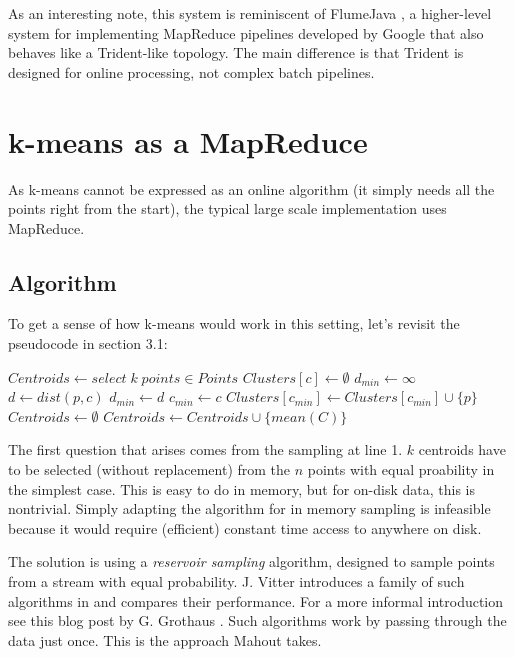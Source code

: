 \documentclass{article}
\begin{document}
As an interesting note, this system is reminiscent of FlumeJava \cite{flume}, 
a higher-level system for implementing MapReduce pipelines developed by Google
that also behaves like a Trident-like topology. The main difference is that
Trident is designed for online processing, not complex batch pipelines.

\section{k-means as a MapReduce}

As k-means cannot be expressed as an online algorithm (it simply needs all the
points right from the start), the typical large scale implementation uses
MapReduce.

\subsection{Algorithm}

To get a sense of how k-means would work in this setting, let's revisit the
pseudocode in section 3.1:

\begin{algorithmic}[1]
    \State $Centroids\gets select\; k\; points \in Points$
            \State $Clusters[c]\gets \emptyset$
        \EndFor
            \State $d_{min}\gets \infty$
                \State $d\gets dist(p, c)$
                    \State $d_{min}\gets d$
                    \State $c_{min} \gets c$
                \EndIf
            \EndFor
            \State $Clusters[c_{min}]\gets Clusters[c_{min}] \cup \{p\}$
        \EndFor
        \State $Centroids\gets \emptyset$
            \State $Centroids\gets Centroids \cup \{mean(C)\}$
        \EndFor
    \EndWhile
\end{algorithmic}

The first question that arises comes from the sampling at line 1. $k$ centroids
have to be selected (without replacement) from the $n$ points with equal
proability in the simplest case. This is easy to do in memory, but for
on-disk data, this is nontrivial.
Simply adapting the algorithm for in memory sampling is infeasible because it
would require (efficient) constant time access to anywhere on disk.

The solution is using a \textit{reservoir sampling} algorithm, designed to
sample points from a stream with equal probability. J. Vitter introduces a
family of such algorithms in \cite{reservoir} and compares their performance.
For a more informal introduction see this blog post by G. Grothaus
\cite{grothaus}.
Such algorithms work by passing through the data just once. This is the
approach Mahout takes.
\end{document}
